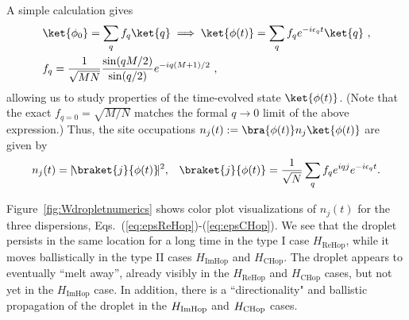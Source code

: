 \documentclass[prx,letterpaper,aps,superscriptaddress,floatfix,twocolumn,nofootinbib]{revtex4-2}
\theoremstyle{definition}
\newcommand{\defn}{:=}
\begin{document}
%
A simple calculation gives
\begin{align}
& \ket{\phi_0} = \sum_q f_q \ket{q} \implies \ket{\phi(t)} = \sum_q f_q e^{-i\epsilon_q t} \ket{q} ~, \\
& f_q = \frac{1}{\sqrt{M N}} \frac{\sin(qM/2)}{\sin(q/2)} e^{-iq (M+1)/2} ~,
\end{align}
allowing us to study properties of the time-evolved state $\ket{\phi(t)}$.
%
(Note that the exact $f_{q=0} = \sqrt{M/N}$ matches the formal $q \to 0$ limit of the above expression.)
%
Thus, the site occupations $n_j(t) \defn \bra{\phi(t)} n_j \ket{\phi(t)}$ are given by
\begin{equation}
n_j(t) = |\!\braket{j}{\phi(t)}\!|^2,\;\;\;
\braket{j}{\phi(t)} = \frac{1}{\sqrt{N}} \sum_q f_q e^{i q j} e^{-i \epsilon_q t}.
\label{eq:njdefn}
\end{equation}
%

%
Figure~\ref{fig:Wdropletnumerics} shows color plot visualizations of $n_j(t)$ for the three dispersions, Eqs.~(\ref{eq:epsReHop})-(\ref{eq:epsCHop}).
%
We see that the droplet persists in the same location for a long time in the type I case $H_{\text{ReHop}}$, while it moves ballistically in the type II cases $H_{\text{ImHop}}$ and $H_{\text{CHop}}$.
%
The droplet appears to eventually ``melt away'', already visibly in the $H_{\text{ReHop}}$ and $H_{\text{CHop}}$ cases, but not yet in the $H_{\text{ImHop}}$ case.
%
In addition, there is a ``directionality" and ballistic propagation of the droplet in the $H_{\rm ImHop}$ and $H_{\rm CHop}$ cases.
\end{document}

